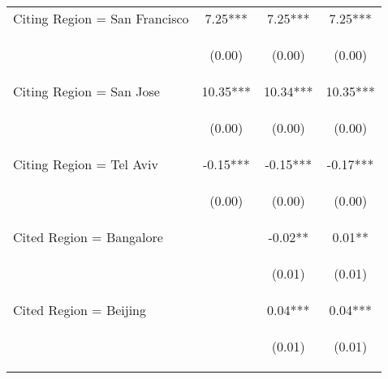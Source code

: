 \begin{center}
\begin{tabular}{lccc}
Citing Region = San Francisco & 7.25*** & 7.25*** & 7.25*** \\
\vspace{4pt} & \begin{footnotesize}(0.00)\end{footnotesize} & \begin{footnotesize}(0.00)\end{footnotesize} & \begin{footnotesize}(0.00)\end{footnotesize} \\
Citing Region = San Jose & 10.35*** & 10.34*** & 10.35*** \\
\vspace{4pt} & \begin{footnotesize}(0.00)\end{footnotesize} & \begin{footnotesize}(0.00)\end{footnotesize} & \begin{footnotesize}(0.00)\end{footnotesize} \\
Citing Region = Tel Aviv & -0.15*** & -0.15*** & -0.17*** \\
\vspace{4pt} & \begin{footnotesize}(0.00)\end{footnotesize} & \begin{footnotesize}(0.00)\end{footnotesize} & \begin{footnotesize}(0.00)\end{footnotesize} \\
Cited Region = Bangalore &  & -0.02** & 0.01** \\
\vspace{4pt} & \begin{footnotesize}\end{footnotesize} & \begin{footnotesize}(0.01)\end{footnotesize} & \begin{footnotesize}(0.01)\end{footnotesize} \\
Cited Region = Beijing &  & 0.04*** & 0.04*** \\
\vspace{4pt} & \begin{footnotesize}\end{footnotesize} & \begin{footnotesize}(0.01)\end{footnotesize} & \begin{footnotesize}(0.01)\end{footnotesize} \\

\end{tabular}
\end{center}

